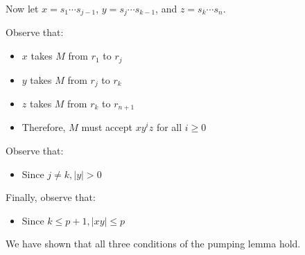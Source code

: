 \documentclass{article}
\begin{document}
Now let $x=s_1\cdots s_{j-1}$, $y=s_j\cdots s_{k-1}$, and $z=s_k\cdots s_n$.
\vspace{1em}

Observe that:
\begin{itemize}
    \item $x$ takes $M$ from $r_1$ to $r_j$
    \item $y$ takes $M$ from $r_j$ to $r_k$
    \item $z$ takes $M$ from $r_k$ to $r_{n+1}$
    \item Therefore, $M$ must accept $xy^i z$ for all $i\geq 0$
\end{itemize}

Observe that:
\begin{itemize}
    \item Since $j\neq k, |y|>0$
\end{itemize}

Finally, observe that:
\begin{itemize}
    \item Since $k\leq p+1, |xy|\leq p$
\end{itemize}

We have shown that all three conditions of the pumping lemma hold.
\end{document}
